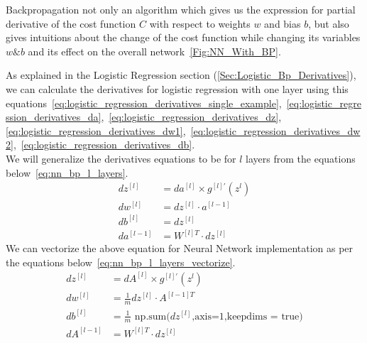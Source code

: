 Backpropagation not only an algorithm which gives us the expression for partial derivative of the cost function $C$ with respect to weights $w$ and bias $b$, but also gives  intuitions about the change of the cost function while changing its variables $w \& b$ and its effect on the overall network~\ref{Fig:NN_With_BP}.

As explained in the Logistic Regression section (\ref{Sec:Logistic_Bp_Derivatives}), we can calculate the derivatives for logistic regression with one layer using this equations~\eqref{eq:logistic_regression_derivatives_single_example},~\eqref{eq:logistic_regression_derivatives_da},~\eqref{eq:logistic_regression_derivatives_dz},\\
\eqref{eq:logistic_regression_derivatives_dw1},~\eqref{eq:logistic_regression_derivatives_dw2},~\eqref{eq:logistic_regression_derivatives_db}.\\

We will generalize the derivatives equations to be for $l$ layers from the equations below~\eqref{eq:nn_bp_l_layers}.%
 \begin{subequations}\label{eq:nn_bp_l_layers}
  \begin{align}
   dz^{[l]} & = da^{[l]} \times g^{[l]'}(z^{l}) \\
   dw^{[l]} & = dz^{[l]} \cdot a^{[l-1]} \\
   db^{[l]} & = dz^{[l]} \\
   da^{[l-1]} & = W^{[l]T} \cdot dz^{[l]} %
 \end{align}
\end{subequations}%
We can vectorize the above equation for Neural Network implementation as per the equations below~\eqref{eq:nn_bp_l_layers_vectorize}.
 \begin{subequations}\label{eq:nn_bp_l_layers_vectorize}
  \begin{align}
   dz^{[l]} & = dA^{[l]} \times g^{[l]'}(z^{l}) \\
   dw^{[l]} & = \frac{1}{m} dz^{[l]} \cdot A^{[l-1]T} \\
   db^{[l]} & = \frac{1}{m} \text{ np.sum(}dz^{[l]}\text{,axis=1,keepdims = true)} \\
   dA^{[l-1]} & = W^{[l]T} \cdot dz^{[l]} %
 \end{align}
\end{subequations}%


